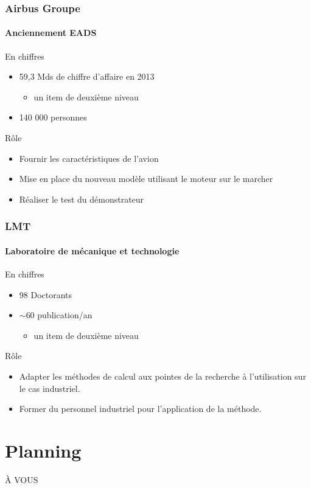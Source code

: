 \documentclass[12pt]{beamer}
\begin{document}
\begin{frame}

\frametitle{Airbus Groupe}
\framesubtitle{Anciennement EADS}

\begin{block}{En chiffres}
\begin{itemize}
  \item 59,3 Mds de chiffre d'affaire en 2013
  \begin{itemize}
     \item un item de deuxième niveau
  \end{itemize}
  \item 140 000 personnes
\end{itemize}
\end{block}
\begin{block}{Rôle}
\begin{itemize}
  \item Fournir les caractéristiques de l'avion
  \item Mise en place du nouveau modèle utilisant le moteur sur le marcher
  \item Réaliser le test du démonstrateur
\end{itemize}
\end{block}

\end{frame}

\begin{frame}

\frametitle{LMT}
\framesubtitle{Laboratoire de mécanique et technologie}

\begin{block}{En chiffres}
\begin{itemize}
  \item 98 Doctorants
  \item $\sim$60 publication/an
  \begin{itemize}
     \item un item de deuxième niveau
  \end{itemize}
\end{itemize}
\end{block}
\begin{block}{Rôle}
\begin{itemize}
  \item Adapter les méthodes de calcul aux pointes de la recherche à l'utilisation sur le cas industriel.
  \item Former du personnel industriel pour l'application de la méthode.
\end{itemize}
\end{block}
\end{frame}

\section{Planning}

À VOUS
\end{document}
